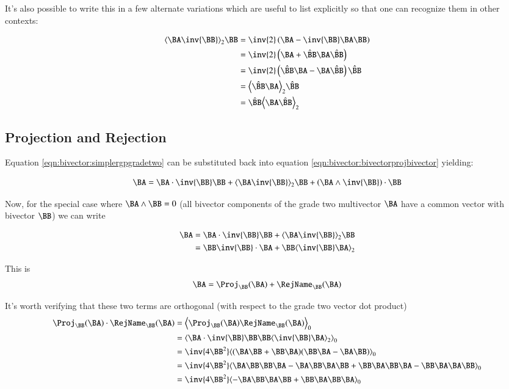 It's also possible to write this in a few alternate variations which are useful to list explicitly so that one can recognize them in other contexts:

\begin{align*}
\gpgradetwo{\BA\inv{\BB}} \BB
&= \inv{2}\left(\BA - \inv{\BB}\BA\BB\right)  \\
&= \inv{2}\left(\BA + \hat{\BB}\BA\hat{\BB}\right)  \\
&= \inv{2}\left( \hat{\BB}\BA -\BA\hat{\BB} \right)\hat{\BB} \\
&= \gpgradetwo{\hat{\BB}\BA}\hat{\BB} \\
&= \hat{\BB}\gpgradetwo{{\BA}\hat{\BB}} \\
\end{align*}

\subsection{Projection and Rejection }

Equation \ref{eqn:bivector:simplergpgradetwo} can be substituted back into equation \ref{eqn:bivector:bivectorprojbivector} yielding:

\begin{equation}\label{eqn:bivector:simplerbivectorprojbivector}
\BA =
\BA \cdot \inv{\BB} \BB \\
+\gpgradetwo{\BA\inv{\BB}} \BB
+\left(\BA \wedge \inv{\BB}\right) \cdot \BB 
\end{equation}

Now, for the special case where $\BA \wedge \BB = 0$ (all bivector components of the grade two multivector $\BA$ have a common vector with bivector $\BB$) we can write

\begin{align*}
\BA 
&= \BA \cdot \inv{\BB} \BB +\gpgradetwo{\BA\inv{\BB}} \BB \\
&= \BB \inv{\BB} \cdot {\BA} + \BB \gpgradetwo{\inv{\BB}\BA} \\
\end{align*}

This is
\begin{align}\label{eqn:bivector:projrejbivectorbivector}
\BA = \Proj_{\BB}(\BA) + \RejName_{\BB}(\BA) 
\end{align}

It's worth verifying that these two terms are orthogonal (with respect to the grade two vector dot product)
\begin{align*}
\Proj_{\BB}(\BA) \cdot \RejName_{\BB}(\BA)
&= \gpgradezero{ \Proj_{\BB}(\BA) \RejName_{\BB}(\BA) } \\
&= \gpgradezero{ \BA \cdot \inv{\BB} \BB \BB \gpgradetwo{\inv{\BB}\BA} } \\
&= \inv{4\BB^2}\gpgradezero{ (\BA\BB + \BB\BA)(\BB\BA - \BA\BB) } \\
&= \inv{4\BB^2}\gpgradezero{ \BA\BB\BB\BA -\BA\BB\BA\BB +\BB\BA\BB\BA -\BB\BA\BA\BB } \\
&= \inv{4\BB^2}\gpgradezero{ -\BA\BB\BA\BB +\BB\BA\BB\BA } \\
\end{align*}


